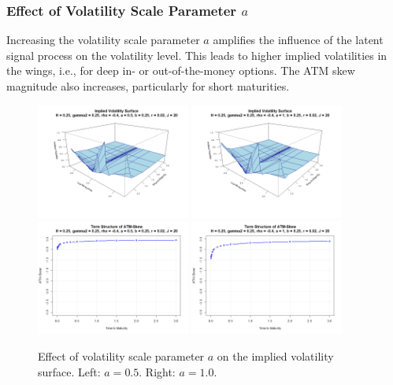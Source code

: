 \subsubsection*{Effect of Volatility Scale Parameter $a$}
\begin{minipage}{\textwidth}
Increasing the volatility scale parameter $a$ amplifies the influence of the latent signal process on the volatility level. This leads to higher implied volatilities in the wings, i.e., for deep in- or out-of-the-money options. The ATM skew magnitude also increases, particularly for short maturities.
\begin{figure}[H]
    \centering
    \includegraphics[width=0.45\textwidth]{figures/5.2 Individual Parameter Effects/a=0.5_iv_surface.png}
	\includegraphics[width=0.45\textwidth]{figures/5.2 Individual Parameter Effects/a=1.0_iv_surface.png}
	\includegraphics[width=0.45\textwidth]{figures/5.2 Individual Parameter Effects/a=0.5_atm_skew.png}
	\includegraphics[width=0.45\textwidth]{figures/5.2 Individual Parameter Effects/a=1.0_atm_skew.png}
    \caption{Effect of volatility scale parameter $a$ on the implied volatility surface. Left: $a=0.5$. Right: $a=1.0$.}
    \label{fig:a_effect}
\end{figure}
\end{minipage}

